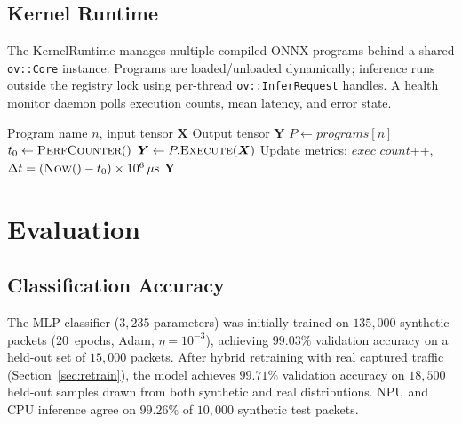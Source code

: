 \documentclass[11pt,a4paper,twoside]{article}
\theoremstyle{definition}
\theoremstyle{remark}
\newcommand{\tensor}[1]{\bm{#1}}
\begin{document}
\subsection{Kernel Runtime}
\label{sec:kernel}

The KernelRuntime manages multiple compiled ONNX programs behind a shared \texttt{ov::Core} instance. Programs are loaded/unloaded dynamically; inference runs outside the registry lock using per-thread \texttt{ov::InferRequest} handles. A health monitor daemon polls execution counts, mean latency, and error state.

\begin{algorithm}[H]
\caption{\textsc{KernelExecute}: Thread-safe program execution with metrics}
\label{alg:kernel-exec}
\begin{algorithmic}[1]
\Require Program name $n$, input tensor $\tensor{X}$
\Ensure Output tensor $\tensor{Y}$
\State $P \gets \textit{programs}[n]$ 
\State $t_0 \gets \textsc{PerfCounter}()$
\State $\tensor{Y} \gets P.\textsc{Execute}(\tensor{X})$ 
\State Update metrics: $\textit{exec\_count}$++, $\Delta t = (\textsc{Now}() - t_0) \times 10^6\,\mu\text{s}$
\State \Return $\tensor{Y}$
\end{algorithmic}
\end{algorithm}


\section{Evaluation}
\label{sec:results}

\subsection{Classification Accuracy}

The MLP classifier ($3{,}235$ parameters) was initially trained on $135{,}000$ synthetic packets (20~epochs, Adam, $\eta = 10^{-3}$), achieving $99.03\%$ validation accuracy on a held-out set of $15{,}000$ packets. After hybrid retraining with real captured traffic (Section~\ref{sec:retrain}), the model achieves $\mathbf{99.71\%}$ validation accuracy on $18{,}500$ held-out samples drawn from both synthetic and real distributions. NPU and CPU inference agree on $99.26\%$ of $10{,}000$ synthetic test packets.
\end{document}
